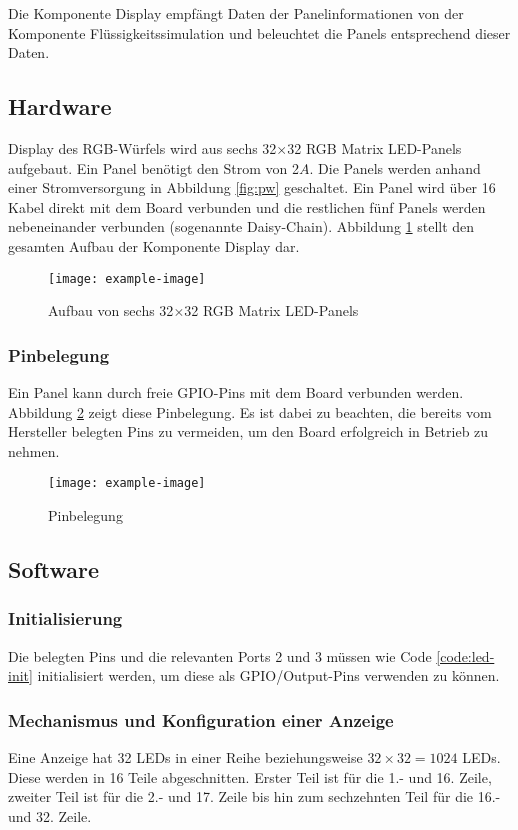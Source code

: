 Die Komponente Display empfängt Daten der Panelinformationen von der Komponente Flüssigkeitssimulation und beleuchtet die Panels entsprechend dieser Daten.

\subsection{Hardware}
Display des RGB-Würfels wird aus sechs 32$\times$32 RGB Matrix LED-Panels aufgebaut. Ein Panel benötigt den Strom von 2$A$. Die Panels werden anhand einer Stromversorgung in Abbildung \ref{fig:pw} geschaltet. Ein Panel wird über 16 Kabel direkt mit dem Board verbunden und die restlichen fünf Panels werden nebeneinander verbunden (sogenannte Daisy-Chain). Abbildung \ref{fig:assembly:display} stellt den gesamten Aufbau der Komponente Display dar.
\begin{figure}
	\centering
	\texttt{[image: example-image]}
	\caption{Aufbau von sechs 32$\times$32 RGB Matrix LED-Panels}
	\label{fig:assembly:display}
\end{figure}

\subsubsection{Pinbelegung}
Ein Panel kann durch freie GPIO-Pins mit dem Board verbunden werden. Abbildung \ref{fig:pins} zeigt diese Pinbelegung. Es ist dabei zu beachten, die bereits vom Hersteller belegten Pins zu vermeiden, um den Board erfolgreich in Betrieb zu nehmen.

\begin{figure}
	\centering
	\texttt{[image: example-image]}
	\caption[Pinbelegung]{Pinbelegung}
	\label{fig:pins}
\end{figure}

\subsection{Software}

\subsubsection{Initialisierung}
Die belegten Pins und die relevanten Ports 2 und 3 müssen wie Code \ref{code:led-init} initialisiert werden, um diese als GPIO/Output-Pins verwenden zu können.

\subsubsection{Mechanismus und Konfiguration einer Anzeige}
Eine Anzeige hat 32 LEDs in einer Reihe beziehungsweise $32 \times 32 = 1024$ LEDs. Diese werden in 16 Teile abgeschnitten. Erster Teil ist für die 1.- und 16. Zeile, zweiter Teil ist für die 2.- und 17. Zeile bis hin zum sechzehnten Teil für die 16.- und 32. Zeile. \\

